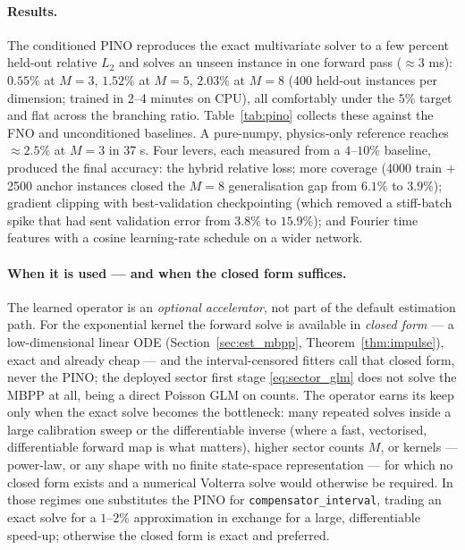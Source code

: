 \documentclass[11pt]{article}
\theoremstyle{plain}
\theoremstyle{definition}
\theoremstyle{remark}
\newcommand{\code}[1]{\texttt{#1}}
\begin{document}
\paragraph{Results.}
The conditioned PINO reproduces the exact multivariate solver to a few percent held-out relative $L_2$ and solves an unseen instance in one forward pass ($\approx3$ ms): $0.55\%$ at $M=3$, $1.52\%$ at $M=5$, $2.03\%$ at $M=8$ (400 held-out instances per dimension; trained in 2--4 minutes on CPU), all comfortably under the $5\%$ target and flat across the branching ratio. Table~\ref{tab:pino} collects these against the FNO and unconditioned baselines. A pure-numpy, physics-only reference reaches $\approx2.5\%$ at $M=3$ in $37$ s. Four levers, each measured from a $4$--$10\%$ baseline, produced the final accuracy: the hybrid relative loss; more coverage (4000 train $+$ 2500 anchor instances closed the $M=8$ generalisation gap from $6.1\%$ to $3.9\%$); gradient clipping with best-validation checkpointing (which removed a stiff-batch spike that had sent validation error from $3.8\%$ to $15.9\%$); and Fourier time features with a cosine learning-rate schedule on a wider network.

\paragraph{When it is used --- and when the closed form suffices.}
The learned operator is an \emph{optional accelerator}, not part of the default estimation path. For the exponential kernel the forward solve is available in \emph{closed form} --- a low-dimensional linear ODE (Section~\ref{sec:est_mbpp}, Theorem~\ref{thm:impulse}), exact and already cheap --- and the interval-censored fitters call that closed form, never the PINO; the deployed sector first stage \eqref{eq:sector_glm} does not solve the MBPP at all, being a direct Poisson GLM on counts. The operator earns its keep only when the exact solve becomes the bottleneck: many repeated solves inside a large calibration sweep or the differentiable inverse (where a fast, vectorised, differentiable forward map is what matters), higher sector counts $M$, or kernels --- power-law, or any shape with no finite state-space representation --- for which no closed form exists and a numerical Volterra solve would otherwise be required. In those regimes one substitutes the PINO for \code{compensator\_interval}, trading an exact solve for a $1$--$2\%$ approximation in exchange for a large, differentiable speed-up; otherwise the closed form is exact and preferred.
\end{document}

